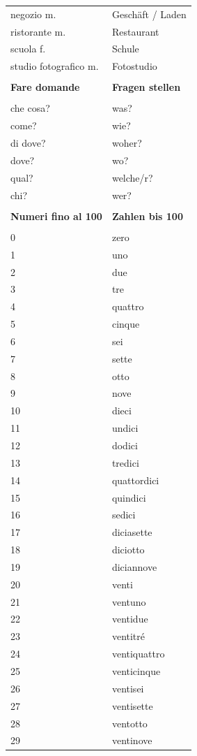 \documentclass[10pt]{scrartcl}
\begin{document}
\begin{multicols*}{2}
\begin{supertabular}{p{4cm}p{4cm}}
negozio \hfill m. & Geschäft / Laden\\
ristorante \hfill m. & Restaurant\\
scuola \hfill f. & Schule\\
studio fotografico \hfill m. & Fotostudio\\
\\
\textbf{Fare domande} & \textbf{Fragen stellen} \\
\\
che cosa? & was?\\
come? & wie?\\
di dove? & woher?\\
dove? & wo?\\
qual? & welche/r?\\
chi? & wer?\\
\\
\textbf{Numeri fino al 100} & \textbf{Zahlen bis 100} \\
\\
0 & zero\\
1 & uno\\
2 & due\\
3 & tre\\
4 & quattro\\
5 & cinque\\
6 & sei\\
7 & sette\\
8 & otto\\
9 & nove\\
10 & dieci\\
11 & undici\\
12 & dodici\\
13 & tredici\\
14 & quattordici\\
15 & quindici\\
16 & sedici\\
17 & diciasette\\
18 & diciotto\\
19 & diciannove\\
20 & venti\\
21 & ventuno\\
22 & ventidue\\
23 & ventitré\\
24 & ventiquattro\\
25 & venticinque\\
26 & ventisei\\
27 & ventisette\\
28 & ventotto\\
29 & ventinove\\

\end{supertabular}
\end{multicols*}
\end{document}

